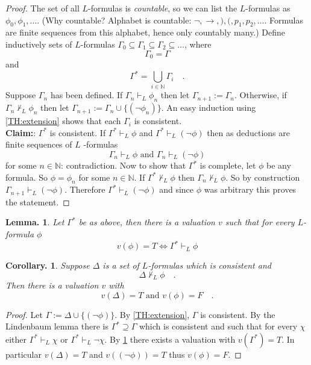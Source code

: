 \documentclass[a4paper,oneside,11pt,DIV=12,parskip=half]{scrartcl}
\newcommand{\N}{\mathbb N}
\theoremstyle{plain}
\newtheorem{lemma}[theorem]{Lemma.}
\newtheorem{corollary}[theorem]{Corollary.}
\theoremstyle{definition}
\newtheorem{remark, definition}[theorem]{Remark and Definition.}
\newtheorem{lemma, definition}[theorem]{Lemma and Definition.}
\newtheorem{theorem, definition}[theorem]{Theorem and Definition.}
\theoremstyle{remark}
\newtheorem*{remark, example}{\textbf{Remark and Exercise}}
\begin{document}
\begin{proof}
The set of all $L$-formulas is \emph{countable}, so we can list the $L$-formulas as $\phi_0,\phi_1,\dots$.
(Why countable? Alphabet is countable: $\lnot, \rightarrow,),(,p_1,p_2,\dots$. Formulas are finite sequences from this alphabet, hence only countably many.)
Define inductively sets of $L$-formulas $\Gamma_0 \subseteq \Gamma_1 \subseteq \Gamma_2\subseteq \dots$, where 
\[ \Gamma_0 = \Gamma\] and \[\Gamma^* = \bigcup_{i \in \N} \Gamma_i \quad .\] Suppose $\Gamma_n$ has been defined. If $\Gamma_n \vdash_L \phi_n$ then let $\Gamma_{n+1} := \Gamma_n$.
Otherwise, if $\Gamma_n \not \vdash_L \phi_n$ then let $\Gamma_{n+1} := \Gamma_n \cup \{(\lnot \phi_n)\}$. An easy induction using \ref{TH:extension} shows that each $\Gamma_i$ is consistent.
\\
\textbf{Claim:}: $\Gamma^*$ is consistent.
If $\Gamma^* \vdash_L \phi$ and $\Gamma^* \vdash_L (\lnot \phi)$ then as deductions are finite sequences of $L$ -formulas \[ \Gamma_n \vdash_L \phi \text{ and } \Gamma_n \vdash_L (\lnot \phi) \] for some $n \in \N$: contradiction.
Now to show that $\Gamma^*$ is complete, let $\phi$ be any formula. So $\phi = \phi_n$ for some $n \in \N$. If $\Gamma^* \not \vdash_L \phi$ then $\Gamma_n \not \vdash_L \phi$. So by construction $\Gamma_{n+1} \vdash_L (\lnot \phi)$. Therefore $\Gamma^* \vdash_L (\lnot \phi)$ and since $\phi$ was arbitrary this proves the statement.
\end{proof}

\begin{lemma} \label{LM:valuation}
Let $\Gamma^*$ be as above, then there is a valuation $v$ such that for every $L$-formula $\phi$
    \[ v(\phi) = T \Leftrightarrow \Gamma^* \vdash_L \phi \]
\end{lemma}

\begin{corollary}
 Suppose $\Delta$ is a set of $L$-formulas which is consistent and 
    \[\Delta \not \vdash_L \phi \quad . \]
    Then there is a valuation $v$ with 
        \[ v(\Delta) = T \text{ and } v(\phi) = F \quad. \]
\end{corollary}

\begin{proof}
 Let $\Gamma:= \Delta \cup \{ (\lnot \phi) \}$. By \ref{TH:extension}, $\Gamma$ is consistent. By the Lindenbaum lemma there is $\Gamma^*  \supseteq \Gamma$ which is consistent and such that for every $\chi$ either $\Gamma^* \vdash_L \chi \text{ or } \Gamma^* \vdash_L \lnot \chi$. By \ref{LM:valuation} there exists a valuation with $v(\Gamma^*) = T$. In particular $v(\Delta) = T$ and $v((\lnot \phi)) = T$ thus $v(\phi) = F$.
\end{proof}
\end{document}
